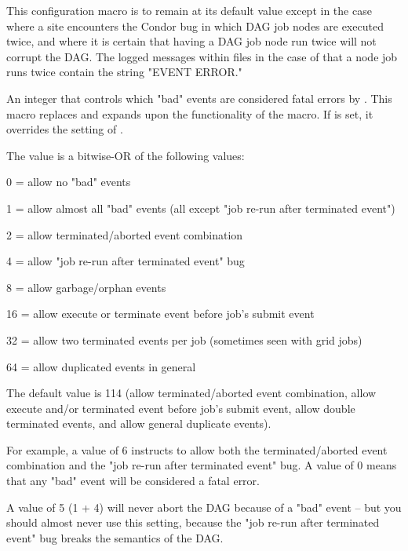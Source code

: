 \begin{description}
This configuration macro is to remain at its default value 
except in the case
where a site encounters the Condor bug in which DAG job nodes
are executed twice,
and where it is certain
that having a DAG job node run twice will not corrupt the DAG.
The logged messages within  files
in the case of that a node job runs twice
contain the string
"EVENT ERROR."

\item[\Macro{DAGMAN\_ALLOW\_EVENTS}]
\label{param:DAGManAllowEvents}
An integer that controls which "bad" events are considered
fatal errors by .  This macro replaces and expands
upon the functionality of the
 macro.
If  is set, it overrides the
setting of .

The  value is a bitwise-OR of the
following values:
\begin{description}
\item 0 = allow no "bad" events
\item 1 = allow almost all "bad" events (all except "job re-run after
terminated event")
\item 2 = allow terminated/aborted event combination
\item 4 = allow "job re-run after terminated event" bug
\item 8 = allow garbage/orphan events
\item 16 = allow execute or terminate event before job's submit event
\item 32 = allow two terminated events per job (sometimes seen
with grid jobs)
\item 64 = allow duplicated events in general
\end{description}

The default value is 114 (allow terminated/aborted event combination,
allow execute and/or terminated event before job's submit event, allow
double terminated events, and allow general duplicate events).

For example, a value of 6 instructs  to allow both
the terminated/aborted event combination and the "job re-run
after terminated event" bug.  A value of 0 means that any "bad"
event will be considered a fatal error.

A value of 5 (1 + 4) will never abort the DAG because of a "bad"
event -- but you should almost never use this setting, because
the "job re-run after terminated event" bug breaks the semantics of
the DAG.


\end{description}
